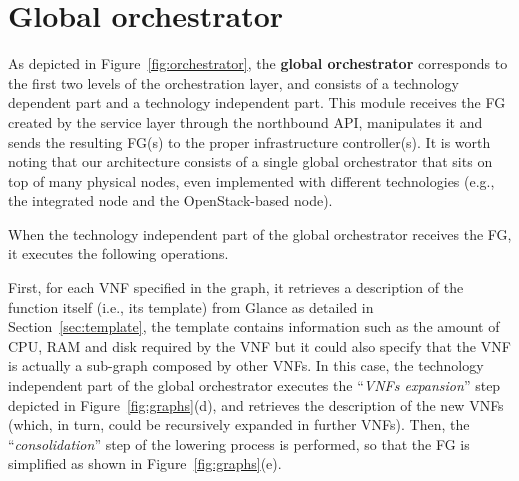 \section{Global orchestrator}
\label{sec:global_orch}


As depicted in Figure~\ref{fig:orchestrator}, the \textbf{global orchestrator} corresponds to the first two levels of the orchestration layer, and consists of %
a technology dependent part and a technology independent part.
This module receives the FG created by the service layer through the northbound API, manipulates it and sends the resulting FG(s) to the proper infrastructure controller(s).
It is worth noting that our architecture consists of a single global orchestrator that sits on top of many physical nodes, even implemented with different technologies (e.g., the integrated node and the OpenStack-based node).

When the technology independent part of the global orchestrator receives the FG, it executes the following operations.

First, for each VNF specified in the graph, it retrieves a description of the function itself (i.e., its template) from Glance
as detailed in Section~\ref{sec:template}, the template contains information such as the amount of CPU, RAM and disk required by the VNF
but it could also specify that the VNF is actually a sub-graph composed by other VNFs.
In this case, the technology independent part of the global orchestrator executes the ``\textit{VNFs expansion}'' step depicted in Figure~\ref{fig:graphs}(d), and retrieves the description of the new VNFs (which, in turn, could be recursively expanded in further VNFs).
Then, the ``\textit{consolidation}'' step of the lowering process is performed, 
so that the FG is simplified as shown in Figure~\ref{fig:graphs}(e). 

